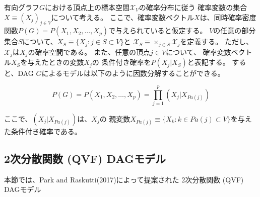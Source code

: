 有向グラフ$G$における頂点上の標本空間$\mathcal X_V$の確率分布に従う
確率変数の集合$X \equiv (X_j)_{j \in V}$について考える。
ここで、確率変数ベクトル$X$は、同時確率密度関数$P(G)=P(X_1, X_2, \dots, X_p)$で与えられていると仮定する。
$V$の任意の部分集合$S$について、$X_S \equiv \{X_j:j\in S \subset V \}$と
$\mathcal X_S \equiv \times_{j \in S} \mathcal X_j$を定義する。
ただし、$\mathcal X_j$は$X_j$の確率空間である。
また、任意の頂点$j\in V$について、
確率変数ベクトル$X_S$を与えたときの変数$X_j$の
条件付き確率を$P(X_j|X_S)$と表記する。
すると、DAG $G$によるモデルは以下のように因数分解することができる\cite{Pearl2009-oh}。

\begin{equation}
  P(G)=P(X_1, X_2, \dots, X_p) = \prod_{j=1}^p (X_j | X_{Pa(j)})
\end{equation}

ここで、$(X_j | X_{Pa(j)})$は、$X_j$の
親変数$X_{Pa(j)} \equiv \{ X_k:k\in Pa(j) \subset V \}$を与えた条件付き確率である。



\subsection{2次分散関数 (QVF) DAGモデル}

本節では、Park and Raskutti(2017)\cite{Park2017-hw}によって提案された
2次分散関数 (QVF) DAGモデル
